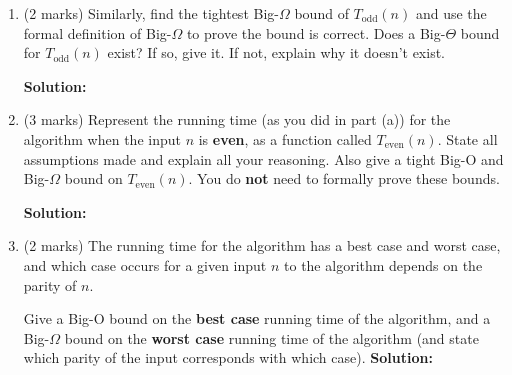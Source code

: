 \documentclass[a4,13pt]{extarticle}
\newenvironment{Solution}{\color{blue}\textbf{Solution:}}{}
\begin{document}
\begin{enumerate}
\begin{enumerate}
	      	      (Hint: you need to find values of $c$ and $n_0$ to prove the Big-O bound you gave is valid).
	      	      
	      	       \begin{Solution}
	      	      \end{Solution}
	      	      	      	                  
	      	\item (2 marks) Similarly, find the tightest Big-$\Omega$ bound of $T_{\text{odd}}(n)$ and use the formal definition of Big-$\Omega$ to prove the bound is correct. Does a Big-$\Theta$ bound for $T_{\text{odd}}(n)$ exist? If so, give it. If not, explain why it doesn't exist.
	      	
	      	\begin{Solution}
	      	\end{Solution}
	      	      	      	                  
	      	      	      	                  
	      	\item (3 marks) Represent the running time (as you did in part (a)) for the algorithm when the input $n$ is \textbf{even}, as a function called $T_{\text{even}}(n)$. State all assumptions made and explain all your reasoning. Also give a tight Big-O and Big-$\Omega$ bound on $T_{\text{even}}(n)$. You do \textbf{not} need to formally prove these bounds.
	      	
	      	\begin{Solution}
	      	\end{Solution}
	      	      	      	                  
	      	\item (2 marks) The running time for the algorithm has a best case and worst case, and which case occurs for a 
	      	      given input $n$ to the algorithm depends on the parity of $n$.
	      	      	      	                  
	      	      Give a Big-O bound on the \textbf{best case} running time of the algorithm, and a Big-$\Omega$ bound on 
	      	      the \textbf{worst case} running time of the algorithm (and state which parity of the input corresponds with which case).
	        \begin{Solution}
	      	\end{Solution}
	      	      	      	      

\end{enumerate}
\end{enumerate}
\end{document}
